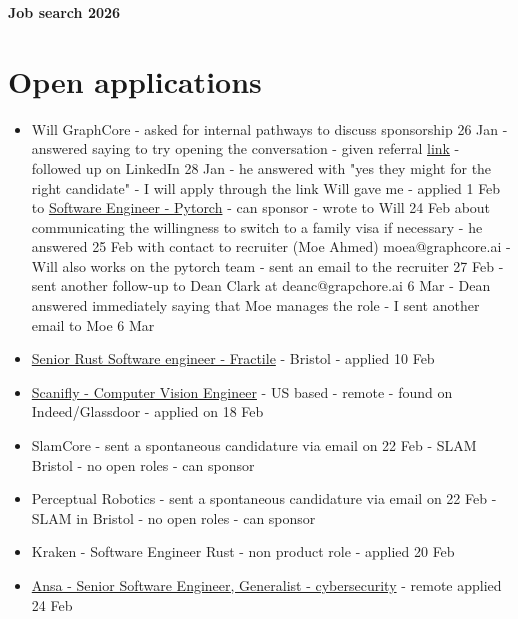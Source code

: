 


\begin{center}
 \textbf{\color{red-milano}\huge{Job search 2026}}
\end{center}


\section*{Open applications}
\begin{itemize}
  \item
    Will GraphCore - asked for internal pathways to discuss sponsorship 26 Jan -
    answered saying to try opening the conversation - given referral
    \href{https://job-boards.greenhouse.io/graphcore?gh_src=1ivvytp02us}{link} -
    followed up on LinkedIn 28 Jan - he answered with "yes they might for the
    right candidate" - I will apply through the link Will gave me - applied 1
    Feb to
    \href{https://job-boards.greenhouse.io/graphcore/jobs/8195293002?gh_src=1ivvytp02us}
    {Software Engineer - Pytorch} - can sponsor - wrote to Will 24 Feb about
    communicating the willingness to switch to a family visa if necessary - he
    answered 25 Feb with contact to recruiter (Moe Ahmed) moea@graphcore.ai - Will also
    works on the pytorch team - sent an email to the recruiter 27 Feb - sent
    another follow-up to Dean Clark at deanc@grapchore.ai 6 Mar - Dean answered
    immediately saying that Moe manages the role - I sent another email to Moe 6
    Mar
  \item
  \href{https://job-boards.eu.greenhouse.io/fractile/jobs/4763161101}{ Senior
    Rust Software engineer - Fractile} - Bristol - applied 10 Feb
  \item
  \href{https://jobs.lever.co/scanifly/921cc53f-e424-4115-b739-516e941c6a8c?lever-source=Indeed}{
  Scanifly - Computer Vision Engineer} - US based - remote - found on
  Indeed/Glassdoor -  applied on 18 Feb
  \item
  SlamCore - sent a spontaneous candidature via email on 22 Feb - SLAM Bristol -
    no open roles - can sponsor
  \item
  Perceptual Robotics - sent a spontaneous candidature via email on 22 Feb -
    SLAM in Bristol - no open roles - can sponsor
  \item Kraken - Software Engineer Rust - non product role - applied 20 Feb 
  \item \href{https://apply.workable.com/anza-xyz/j/C3154D9B03/apply/}{Ansa -
    Senior Software Engineer, Generalist - cybersecurity} - remote applied 24 Feb

\end{itemize}
